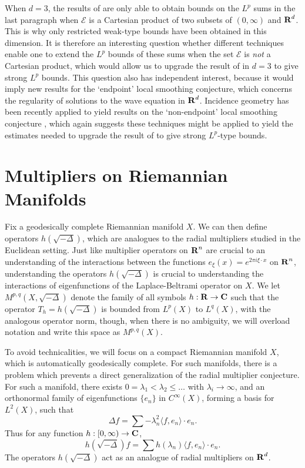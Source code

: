When $d = 3$, the results of \cite{Cladek} are only able to obtain bounds on the $L^p$ sums in the last paragraph when $\mathcal{E}$ is a Cartesian product of two subsets of $(0,\infty)$ and $\operatorname{\mathbf{R}}^d$. This is why only restricted weak-type bounds have been obtained in this dimension. It is therefore an interesting question whether different techniques enable one to extend the $L^p$ bounds of these sums when the set $\mathcal{E}$ is \emph{not} a Cartesian product, which would allow us to upgrade the result of \cite{Cladek} in $d = 3$ to give strong $L^p$ bounds. This question also has independent interest, because it would imply new results for the `endpoint' local smoothing conjecture, which concerns the regularity of solutions to the wave equation in $\operatorname{\mathbf{R}}^d$. Incidence geometry has been recently applied to yield results on the `non-endpoint' local smoothing conjecture \cite{GuthandWangandZhang}, which again suggests these techniques might be applied to yield the estimates needed to upgrade the result of \cite{Cladek} to give strong $L^p$-type bounds.

\section{Multipliers on Riemannian Manifolds}

Fix a geodesically complete Riemannian manifold $X$. We can then define operators $h(\sqrt{-\Delta})$, which are analogues to the radial multipliers studied in the Euclidean setting. Just like multiplier operators on $\operatorname{\mathbf{R}}^n$ are crucial to an understanding of the interactions between the functions $e_\xi(x) = e^{2 \pi i \xi \cdot x}$ on $\operatorname{\mathbf{R}}^n$, understanding the operators $h(\sqrt{-\Delta})$ is crucial to understanding the interactions of eigenfunctions of the Laplace-Beltrami operator on $X$. We let $M^{p,q}(X, \sqrt{-\Delta} )$ denote the family of all symbols $h: \operatorname{\mathbf{R}} \to \operatorname{\mathbf{C}}$ such that the operator $T_h = h(\sqrt{-\Delta})$ is bounded from $L^p(X)$ to $L^q(X)$, with the analogous operator norm, though, when there is no ambiguity, we will overload notation and write this space as $M^{p,q}(X)$.


To avoid technicalities, we will focus on a compact Riemannian manifold $X$, which is automatically geodesically complete. For such manifolds, there is a problem which prevents a direct generalization of the radial multiplier conjecture. For such a manifold, there exists $0 = \lambda_1 < \lambda_2 \leq \dots$ with $\lambda_i \to \infty$, and an orthonormal family of eigenfunctions $\{ e_n \}$ in $C^\infty(X)$, forming a basis for $L^2(X)$, such that
%
\[ \Delta f = \sum - \lambda_n^2 \langle f, e_n \rangle \cdot e_n. \]
%
Thus for any function $h: [0,\infty) \to \operatorname{\mathbf{C}}$,
%
\[ h \left( \sqrt{-\Delta} \right) f = \sum h(\lambda_n) \langle f, e_n \rangle \cdot e_n. \]
%
The operators $h ( \sqrt{-\Delta} )$ act as an analogue of radial multipliers on $\operatorname{\mathbf{R}}^d$.

